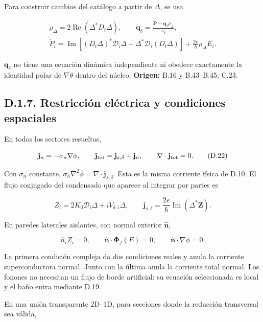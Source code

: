 \documentclass[
  spanish,
  10pt,
  a4paper,
]{article}
\newcounter{none} %
\begin{document}
Para construir cambios del catálogo a partir de \(\Delta\), se usa

\[
\begin{gathered}
\dot\rho_\Delta=2\operatorname{Re}(\Delta^*D_t\Delta),\qquad
\dot{\mathbf q}_\delta=\frac{\dot{\mathbf P}-\mathbf q_\delta\dot\rho_\Delta}{s_\delta},\\
\dot P_i=\operatorname{Im}\left[(D_t\Delta)^*\mathcal D_i\Delta
+\Delta^*\mathcal D_i(D_t\Delta)\right]
+\frac{2e}{\hbar}\rho_\Delta E_i.
\end{gathered}\tag{D.21}
\]

\(\mathbf q_\delta\) no tiene una ecuación dinámica independiente ni
obedece exactamente la identidad polar de \(\nabla\theta\) dentro del
núcleo. \textbf{Origen:} B.16 y B.43--B.45; C.23.

\subsection{D.1.7. Restricción eléctrica y condiciones
espaciales}\label{d.1.7.-restricciuxf3n-eluxe9ctrica-y-condiciones-espaciales}

En todos los sectores resueltos,

\[
\mathbf j_n=-\sigma_n\nabla\phi,\qquad
\mathbf j_{\rm tot}=\mathbf j_{s,\delta}+\mathbf j_n,\qquad
\nabla\cdot\mathbf j_{\rm tot}=0.
\tag{D.22}
\]

Con \(\sigma_n\) constante,
\(\sigma_n\nabla^2\phi=\nabla\cdot\mathbf j_{s,\delta}\). Esta es la
misma corriente física de D.10. El flujo conjugado del condensado que
aparece al integrar por partes es

\[
Z_i=2K_0\mathcal D_i\Delta+iV_{\delta,i}\Delta,\qquad
\mathbf j_{s,\delta}=\frac{2e}{\hbar}\operatorname{Im}(\Delta^*\mathbf Z).
\tag{D.23}
\]

En paredes laterales aislantes, con normal exterior
\(\widehat{\mathbf n}\),

\[
\widehat n_iZ_i=0,\qquad
\widehat{\mathbf n}\cdot\boldsymbol\Phi_f(E)=0,\qquad
\widehat{\mathbf n}\cdot\nabla\phi=0.
\tag{D.24}
\]

La primera condición compleja da dos condiciones reales y anula la
corriente superconductora normal. Junto con la última anula la corriente
total normal. Los fonones no necesitan un flujo de borde artificial: su
ecuación seleccionada es local y el baño entra mediante D.19.

En una unión transparente 2D--1D, para secciones donde la reducción
transversal sea válida,
\end{document}
